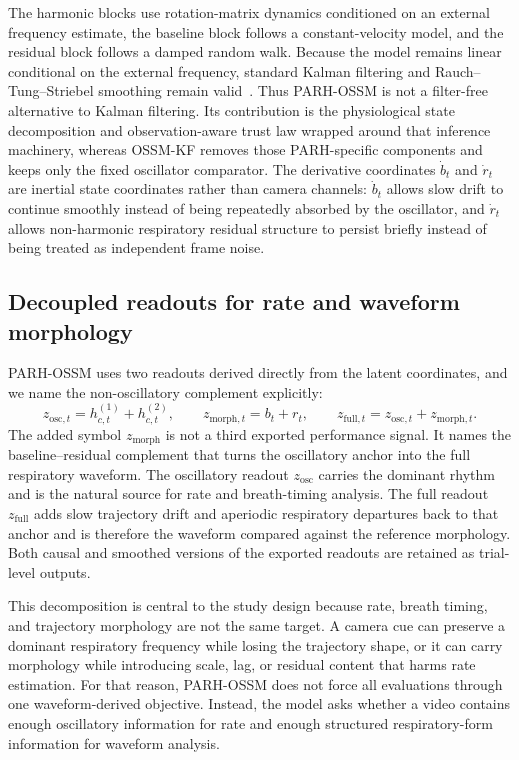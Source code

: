 \documentclass[fleqn,10pt]{wlscirep}
\begin{document}
The harmonic blocks use rotation-matrix dynamics conditioned on an external
frequency estimate, the baseline block follows a constant-velocity model, and
the residual block follows a damped random walk. Because the model remains
linear conditional on the external frequency, standard Kalman filtering and
Rauch--Tung--Striebel smoothing remain valid~\cite{Kalman1960,Sarkka2013,RauchTungStriebel1965}.
Thus PARH-OSSM is not a filter-free alternative to Kalman filtering. Its
contribution is the physiological state decomposition and observation-aware
trust law wrapped around that inference machinery, whereas OSSM-KF removes
those PARH-specific components and keeps only the fixed oscillator comparator.
The derivative coordinates $\dot{b}_t$ and $\dot{r}_t$ are inertial state
coordinates rather than camera channels: $\dot{b}_t$ allows slow drift to
continue smoothly instead of being repeatedly absorbed by the oscillator, and
$\dot{r}_t$ allows non-harmonic respiratory residual structure to persist
briefly instead of being treated as independent frame noise.

\subsection*{Decoupled readouts for rate and waveform morphology}
PARH-OSSM uses two readouts derived directly from the latent coordinates, and
we name the non-oscillatory complement explicitly:
\begin{equation}
z_{\mathrm{osc},t}
    = h_{c,t}^{(1)} + h_{c,t}^{(2)},
\qquad
z_{\mathrm{morph},t}
    = b_t + r_t,
\qquad
z_{\mathrm{full},t}
    = z_{\mathrm{osc},t} + z_{\mathrm{morph},t}.
\end{equation}
The added symbol $z_{\mathrm{morph}}$ is not a third exported performance
signal. It names the baseline--residual complement that turns the oscillatory
anchor into the full respiratory waveform. The oscillatory readout
$z_{\mathrm{osc}}$ carries the dominant rhythm and is the natural source for
rate and breath-timing analysis. The full readout $z_{\mathrm{full}}$ adds slow
trajectory drift and aperiodic respiratory departures back to that anchor and is
therefore the waveform compared against the reference morphology. Both causal
and smoothed versions of the exported readouts are retained as trial-level
outputs.

This decomposition is central to the study design because rate, breath timing,
and trajectory morphology are not the same target. A camera cue can preserve a
dominant respiratory frequency while losing the trajectory shape, or it can
carry morphology while introducing scale, lag, or residual content that harms
rate estimation. For that reason, PARH-OSSM does not force all evaluations
through one waveform-derived objective. Instead, the model asks whether a video
contains enough oscillatory information for rate and enough structured
respiratory-form information for waveform analysis.
\end{document}
